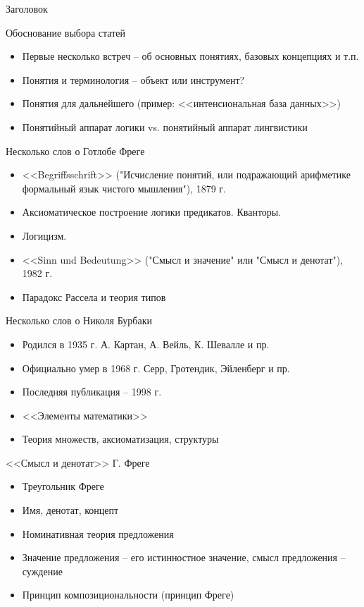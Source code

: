 \documentclass{beamer}
\begin{document}
\begin{frame}{Заголовок}
\end{frame}

\begin{frame}{Обоснование выбора статей}
    \begin{itemize}
        \item Первые несколько встреч -- об основных понятиях, базовых концепциях и т.п.
        \item Понятия и терминология -- объект или инструмент?
        \item Понятия для дальнейшего (пример: <<интенсиональная база данных>>)
        \item Понятийный аппарат логики vs. понятийный аппарат лингвистики
    \end{itemize}
\end{frame}

\begin{frame}{Несколько слов о Готлобе Фреге}
\begin{itemize}
  \item <<Begriffsschrift>> ("Исчисление понятий, или подражающий арифметике формальный язык чистого мышления"), 1879 г.
  \item Аксиоматическое построение логики предикатов. Кванторы.
  \item Логицизм.
  \item <<Sinn und Bedeutung>> ("Смысл и значение" или "Смысл и денотат"), 1982 г.
  \item Парадокс Рассела и теория типов
\end{itemize}
\end{frame}

\begin{frame}{Несколько слов о Николя Бурбаки}
\begin{itemize}
  \item Родился в 1935 г. А. Картан, А. Вейль, К. Шевалле и пр.
  \item Официально умер в 1968 г. Серр, Гротендик, Эйленберг и пр.
  \item Последняя публикация -- 1998 г.
  \item <<Элементы математики>>
  \item Теория множеств, аксиоматизация, структуры
\end{itemize}
\end{frame}

\begin{frame}{<<Смысл и денотат>> Г. Фреге}
\begin{itemize}
  \item Треугольник Фреге
  \item Имя, денотат, концепт
  \item Номинативная теория предложения
  \item Значение предложения -- его истинностное значение, смысл предложения -- суждение
  \item Принцип композициональности (принцип Фреге)
\end{itemize}
\end{frame}
\end{document}
